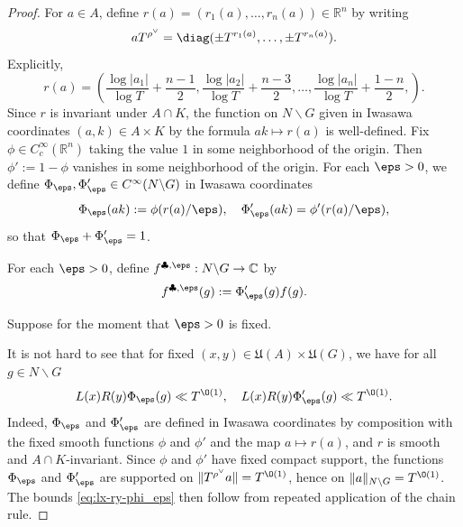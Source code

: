 \begin{proof}
  For $a \in A$, define $r(a)  = (r_1(a),\dotsc,r_n(a)) \in \mathbb{R}^n$ by writing
  \begin{equation*}
    a T^{\rho^\vee} = \diag(\pm T^{r_1(a)}, \dotsc, \pm T^{r_n(a)}).
  \end{equation*}
  Explicitly,
  \begin{equation*}
    r(a) =
    \left(
      \frac{\log |a_1|}{\log T} + \frac{n - 1}{2},
      \frac{\log |a_2|}{\log T} + \frac{n - 3}{2},
      \dotsc,
      \frac{\log |a_n|}{\log T} + \frac{1 - n}{2},
    \right).
  \end{equation*}
  Since $r$ is invariant under $A \cap K$, the function on $N \backslash G$ given in Iwasawa coordinates $(a,k) \in A \times K$ by the formula $a k \mapsto r(a)$ is well-defined.  Fix $\phi \in C_c^\infty(\mathbb{R}^n)$ taking the value $1$ in some neighborhood of the origin.  Then $\phi ' := 1 - \phi$ vanishes in some neighborhood of the origin.  For each $\eps > 0$, we define $\Phi_\eps , \Phi_\eps ' \in C^\infty(N \backslash G)$ in Iwasawa coordinates
  \begin{equation*}
    \Phi_\eps (a k ) := \phi(r(a)/\eps), \quad
    \Phi_\eps '(a k) = \phi '(r(a) / \eps),
  \end{equation*}
  so that $\Phi_\eps  + \Phi_\eps  ' = 1$.

  For each $\eps > 0$, define $f^{\clubsuit, \eps} : N \backslash G \rightarrow \mathbb{C}$ by
  \begin{equation*}
    f^{\clubsuit, \eps }(g) := \Phi'_\eps (g) f(g).
  \end{equation*}

  Suppose for the moment that $\eps > 0$ is fixed.

  It is not hard to see that for fixed $(x,y) \in \mathfrak{U}(A) \times \mathfrak{U}(G)$, we have for all $g \in N \backslash G$
  \begin{equation}\label{eq:lx-ry-phi_eps}
    L(x) R(y) \Phi_\eps (g) \ll T^{\O(1)}, \quad
    L(x) R(y) \Phi_\eps '(g) \ll T^{\O(1)}.
  \end{equation}
  Indeed, $\Phi_\eps$ and $\Phi_\eps'$ are defined in Iwasawa coordinates by composition with the fixed smooth functions $\phi$ and $\phi'$ and the map $a \mapsto r(a)$, and $r$ is smooth and $A\cap K$-invariant.  Since $\phi$ and $\phi'$ have fixed compact support, the functions $\Phi_\eps$ and $\Phi_\eps'$ are supported on $\|T^{\rho^\vee}a\| = T^{\O(1)}$, hence on $\|a\|_{N\backslash G} = T^{\O(1)}$.  The bounds \eqref{eq:lx-ry-phi_eps} then follow from repeated application of the chain rule.


\end{proof}

